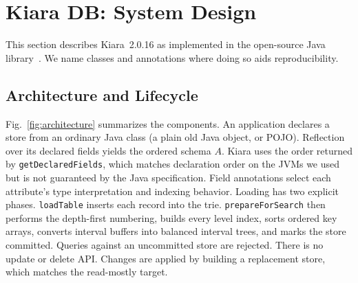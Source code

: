 \section{Kiara DB: System Design}
\label{sec:system}

This section describes Kiara~2.0.16 as implemented in the open-source Java library~\cite{kiara2026software}. We name classes and annotations where doing so aids reproducibility.

\subsection{Architecture and Lifecycle}
Fig.~\ref{fig:architecture} summarizes the components. An application declares a store from an ordinary Java class (a plain old Java object, or POJO). Reflection over its declared fields yields the ordered schema $A$. Kiara uses the order returned by \texttt{getDeclaredFields}, which matches declaration order on the JVMs we used but is not guaranteed by the Java specification. Field annotations select each attribute's type interpretation and indexing behavior. Loading has two explicit phases. \texttt{loadTable} inserts each record into the trie. \texttt{prepareForSearch} then performs the depth-first numbering, builds every level index, sorts ordered key arrays, converts interval buffers into balanced interval trees, and marks the store committed. Queries against an uncommitted store are rejected. There is no update or delete API. Changes are applied by building a replacement store, which matches the read-mostly target.

